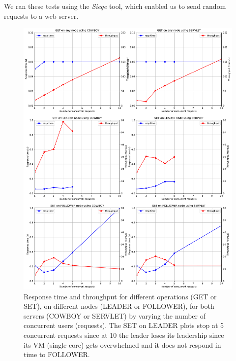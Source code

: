 \documentclass[a4paper]{article}
\begin{document}
We ran these tests using the \emph{Siege} tool, which enabled us to send 
random requests to a web server.

\begin{figure}
    \includegraphics[width=\textwidth]{plot.pdf}
    \caption{Response time and throughput for different operations (GET or SET), on different nodes (LEADER or FOLLOWER), for both servers (COWBOY or SERVLET) by varying the number of concurrent users (requests). The SET on LEADER plots stop at 5 concurrent requests since at 10 the leader loses its leadership since its VM (single core) gets overwhelmed and it does not respond in time to FOLLOWER.}
    \label{fig:plot}
\end{figure}
\end{document}
